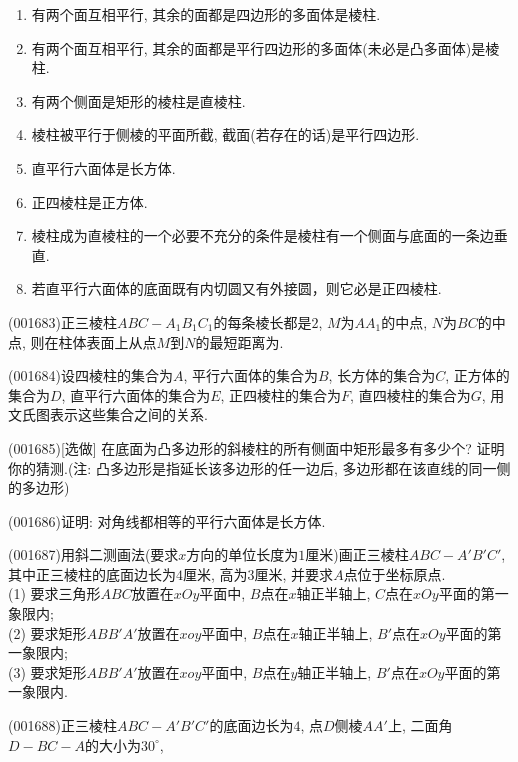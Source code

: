 \begin{enumerate}[\blank{30}(1)]
\item 有两个面互相平行, 其余的面都是四边形的多面体是棱柱.\\ 
\item 有两个面互相平行, 其余的面都是平行四边形的多面体(未必是凸多面体)是棱柱.\\ 
\item 有两个侧面是矩形的棱柱是直棱柱.\\ 
\item 棱柱被平行于侧棱的平面所截, 截面(若存在的话)是平行四边形.\\ 
\item 直平行六面体是长方体.\\ 
\item 正四棱柱是正方体.\\ 
\item 棱柱成为直棱柱的一个必要不充分的条件是棱柱有一个侧面与底面的一条边垂直.\\ 
\item 若直平行六面体的底面既有内切圆又有外接圆，则它必是正四棱柱.\\ 
\end{enumerate}
\item (001683)正三棱柱$ABC-A_1B_1C_1$的每条棱长都是$2$, $M$为$AA_1$的中点, $N$为$BC$的中点, 则在柱体表面上从点$M$到$N$的最短距离为.
\item (001684)设四棱柱的集合为$A$, 平行六面体的集合为$B$, 长方体的集合为$C$, 正方体的集合为$D$,
直平行六面体的集合为$E$, 正四棱柱的集合为$F$, 直四棱柱的集合为$G$, 用文氏图表示这些集合之间的关系.
\item (001685)[选做]
在底面为凸多边形的斜棱柱的所有侧面中矩形最多有多少个? 证明你的猜测.(注: 凸多边形是指延长该多边形的任一边后, 多边形都在该直线的同一侧的多边形)
\item (001686)证明: 对角线都相等的平行六面体是长方体.
\item (001687)用斜二测画法(要求$x$方向的单位长度为$1$厘米)画正三棱柱$ABC-A'B'C'$, 其中正三棱柱的底面边长为$4$厘米, 高为$3$厘米, 并要求$A$点位于坐标原点.\\ 
(1) 要求三角形$ABC$放置在$xOy$平面中, $B$点在$x$轴正半轴上, $C$点在$xOy$平面的第一象限内;\\ 
(2) 要求矩形$ABB'A'$放置在$xoy$平面中, $B$点在$x$轴正半轴上, $B'$点在$xOy$平面的第一象限内;\\ 
(3) 要求矩形$ABB'A'$放置在$xoy$平面中, $B$点在$y$轴正半轴上, $B'$点在$xOy$平面的第一象限内.
\item (001688)正三棱柱$ABC-A'B'C'$的底面边长为$4$, 点$D$侧棱$AA'$上, 二面角$D-BC-A$的大小为$30^\circ$,
